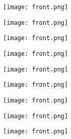 \documentclass[a4paper]{article}
\begin{document}
\begin{center}
	\centering
	\texttt{[image: front.png]}
\end{center}

\newpage

\begin{center}
	\centering
	\texttt{[image: front.png]}
\end{center}

\newpage

\begin{center}
	\centering
	\texttt{[image: front.png]}
\end{center}

\newpage

\begin{center}
	\centering
	\texttt{[image: front.png]}
\end{center}

\newpage

\begin{center}
	\centering
	\texttt{[image: front.png]}
\end{center}

\newpage

\begin{center}
	\centering
	\texttt{[image: front.png]}
\end{center}

\newpage

\begin{center}
	\centering
	\texttt{[image: front.png]}
\end{center}

\newpage

\begin{center}
	\centering
	\texttt{[image: front.png]}
\end{center}

\newpage

\begin{center}
	\centering
	\texttt{[image: front.png]}
\end{center}
\end{document}

